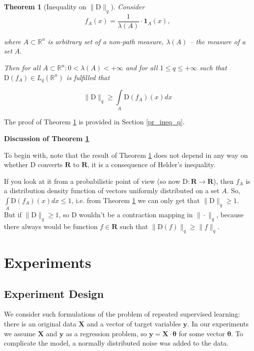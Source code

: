 \documentclass{article}
\newtheorem{theorem}{Theorem}
\begin{document}
    \begin{theorem}[Inequality on $\|\text{D}\|_q$] \label{ineq_q}
        Consider 
        \begin{equation}\label{f_R}
            f_A(x) = \dfrac{1}{\lambda(A)} \cdot \textbf{1}_{A}(x),
        \end{equation}

        where $A \subset \mathbb{R}^n$ is arbitrary set of a non-path measure, $\lambda(A)$ -- the measure of a set $A$.

        Then for all $A \subset \mathbb{R}^n :  0 < \lambda(A) < +\infty$ and for all $1 \leq q \leq +\infty$ such that $\text{D}(f_A) \in L_q(\mathbb{R}^n)$ is fulfilled that  

        \begin{equation}\label{int_f_R}
            \|\text{D}\|_q \geq \int\limits_{A} \text{D}(f_A)(x)dx
        \end{equation}
    \end{theorem}

    The proof of Theorem \ref{ineq_q} is provided in Section \ref{pr_ineq_q}.
        
    \textbf{Discussion of Theorem \ref{ineq_q}}

    To begin with, note that the result of Theorem \ref{ineq_q} does not depend in any way on whether $\text{D}$ converts $\mathbf{R}$ to $\mathbf{R}$, it is a consequence of Helder's inequality. 
    
    If you look at it from a probabilistic point of view (so now $\text{D} : \mathbf{R} \to \mathbf{R}$), then $f_A$ is a distribution density function of vectors uniformly distributed on a set $A$. So, $\int\limits_{A} \text{D}(f_A)(x)dx \leq 1$, i.e. from Theorem \ref{ineq_q} we can only get that $\|\text{D}\|_q \geq 1$. But if $\|\text{D}\|_q \geq 1$, so $\text{D}$ wouldn't be a contraction mapping in $\|\cdot\|_q$, because there always would be function $f \in \mathbf{R}$ such that $\|\text{D}(f)\|_q \geq \|f\|_q$.

\section{Experiments} \label{Experiments}

    \subsection{Experiment Design} \label{design}
        We consider \footnotemark such formulations of the problem of repeated supervised learning: there is an original data $\textbf{X}$ and a vector of target variables $\mathbf{y}$. In our experiments we assume $\mathbf{X}$ and $\mathbf{y}$ as a regression problem, so $\mathbf{y} = \mathbf{X}  \cdot \mathbf{\theta}$ for some vector $\mathbf{\theta}$. To complicate the model, a normally distributed noise was added to the data.
        
\end{document}
